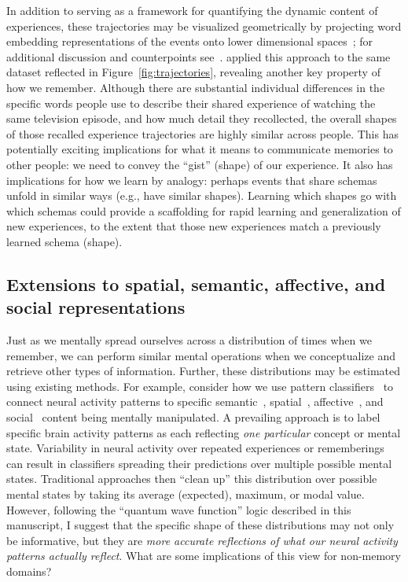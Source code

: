 \documentclass{article}
\begin{document}
In addition to serving as a framework for quantifying the dynamic content of experiences, these trajectories may be visualized geometrically by projecting word embedding representations of the events onto lower dimensional spaces~\citep[e.g., ][]{HeusEtal18a}; for additional discussion and counterpoints see~\cite{JollChan18}.  \cite{HeusEtal18c} applied this approach to the same dataset reflected in Figure~\ref{fig:trajectories}, revealing another key property of how we remember.  Although there are substantial individual differences in the specific words people use to describe their shared experience of watching the same television episode, and how much detail they recollected, the overall shapes of those recalled experience trajectories are highly similar across people.  This has potentially exciting implications for what it means to communicate memories to other people: we need to convey the ``gist'' (shape) of our experience.  It also has implications for how we learn by analogy: perhaps events that share schemas~\citep[e.g., ][]{BaldEtal18}  unfold in similar ways (e.g., have similar shapes).  Learning which shapes go with which schemas could provide a scaffolding for rapid learning and generalization of new experiences, to the extent that those new experiences match a previously learned schema (shape).


\subsection*{Extensions to spatial, semantic, affective, and social representations}
Just as we mentally spread ourselves across a distribution of times when we remember, we can perform similar mental operations when we conceptualize and retrieve other types of information.  Further, these distributions may be estimated using existing methods.  For example, consider how we use pattern classifiers~\citep{NormEtal06b} to connect neural activity patterns to specific semantic~\citep{PolyEtal05, MitcEtal08, MannEtal12}, spatial~\citep{MillEtal13}, affective~\citep{ChanEtal18}, and social~\citep{MeyeEtal18} content being mentally manipulated.
A prevailing approach is to label specific brain activity patterns as each reflecting \textit{one particular} concept or mental state.  Variability in neural activity over repeated experiences or rememberings can result in classifiers spreading their predictions over multiple possible mental states.  Traditional approaches then ``clean up'' this distribution over possible mental states by taking its average (expected), maximum, or modal value.  However, following the ``quantum wave function'' logic described in this manuscript, I suggest that the specific shape of these distributions may not only be informative, but they are \textit{more accurate reflections of what our neural activity patterns actually reflect}.  What are some implications of this view for non-memory domains?
\end{document}
